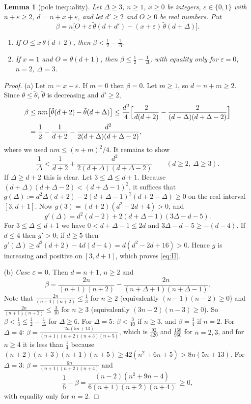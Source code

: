 \documentclass[11pt]{article}
\newtheorem{lemma}[theorem]{Lemma}
\theoremstyle{definition}
\theoremstyle{remark}
\newcommand{\tht}{\theta}
\newcommand{\tth}{\tilde\theta}
\begin{document}
\begin{lemma}[pole inequality]\label{lem:pole}
Let $\Delta\ge3$, $n\ge1$, $x\ge0$ be integers, $\varepsilon\in\{0,1\}$ with $n+\varepsilon\ge2$,
$d=n+x+\varepsilon$, and let $d'\ge2$ and $O\ge0$ be real numbers. Put
\[
 \beta=n\bigl[O+\varepsilon\,\tth(d+d')-(x+\varepsilon)\,\tth(d+\Delta)\bigr].
\]
\begin{enumerate}[label=\textup{(\alph*)}]
\item If $O\le x\,\tht(d+2)$, then $\beta<\frac12-\frac1\Delta$.
\item If $x=1$ and $O=\tht(d+1)$, then $\beta\le\frac12-\frac1\Delta$, with equality only for
 $\varepsilon=0$, $n=2$, $\Delta=3$.
\end{enumerate}
\end{lemma}
\begin{proof}
(a) Let $m=x+\varepsilon$. If $m=0$ then $\beta=0$. Let $m\ge1$, so $d=n+m\ge2$. Since
$\tht\le\tth$, $\tth$ is decreasing and $d'\ge2$,
\begin{align*}
 \beta&\le nm\bigl[\tth(d+2)-\tth(d+\Delta)\bigr]\le\frac{d^2}{4}\Bigl[\frac{2}{d(d+2)}-\frac{2}{(d+\Delta)(d+\Delta-2)}\Bigr]\\
 &=\frac12-\frac1{d+2}-\frac{d^2}{2(d+\Delta)(d+\Delta-2)} ,
\end{align*}
where we used $nm\le(n+m)^2/4$. It remains to show
\begin{equation}\label{eq:II}
 \frac1\Delta<\frac1{d+2}+\frac{d^2}{2(d+\Delta)(d+\Delta-2)}\qquad(d\ge2,\ \Delta\ge3).
\end{equation}
If $\Delta\ge d+2$ this is clear. Let $3\le\Delta\le d+1$. Because
$(d+\Delta)(d+\Delta-2)<(d+\Delta-1)^2$, it suffices that
$g(\Delta):=d^2\Delta(d+2)-2(d+\Delta-1)^2(d+2-\Delta)\ge0$ on the real interval $[3,d+1]$.
Now $g(3)=(d+2)(d^2-2d+4)>0$, and
\[
 g'(\Delta)=d^2(d+2)+2(d+\Delta-1)(3\Delta-d-5).
\]
For $3\le\Delta\le d+1$ we have $0<d+\Delta-1\le2d$ and $3\Delta-d-5\ge-(d-4)$. If $d\le4$
then $g'>0$; if $d\ge5$ then $g'(\Delta)\ge d^2(d+2)-4d(d-4)=d(d^2-2d+16)>0$. Hence $g$ is
increasing and positive on $[3,d+1]$, which proves \eqref{eq:II}.

(b) \emph{Case $\varepsilon=0$.} Then $d=n+1$, $n\ge2$ and
\[
 \beta=\frac{2n}{(n+1)(n+2)}-\frac{2n}{(n+\Delta+1)(n+\Delta-1)} .
\]
Note that $\frac{2n}{(n+1)(n+2)}\le\frac13$ for $n\ge2$ (equivalently $(n-1)(n-2)\ge0$) and
$\frac{2n}{(n+1)(n+2)}\le\frac3{10}$ for $n\ge3$ (equivalently $(3n-2)(n-3)\ge0$). So
$\beta<\frac13\le\frac12-\frac1\Delta$ for $\Delta\ge6$. For $\Delta=5$:
$\beta<\frac3{10}$ if $n\ge3$, and $\beta=\frac14$ if $n=2$. For $\Delta=4$:
$\beta=\frac{2n(5n+13)}{(n+1)(n+2)(n+3)(n+5)}$, which is $\frac{92}{420}$ and
$\frac{168}{960}$ for $n=2,3$, and for $n\ge4$ it is less than $\frac14$ because
$(n+2)(n+3)(n+1)(n+5)\ge42(n^2+6n+5)>8n(5n+13)$. For $\Delta=3$:
$\beta=\frac{6n}{(n+1)(n+2)(n+4)}$ and
\[
 \frac16-\beta=\frac{(n-2)(n^2+9n-4)}{6(n+1)(n+2)(n+4)}\ \ge0 ,
\]
with equality only for $n=2$.


\end{proof}
\end{document}
